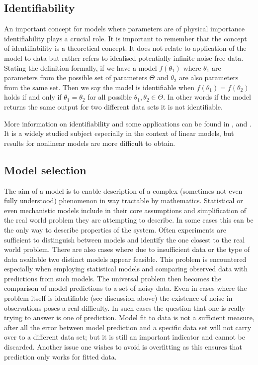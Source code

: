 \subsection{Identifiability}
\label{sec:identifiability-back}

An important concept for models where parameters are of physical importance identifiability plays a crucial role. It is important to remember that the concept of identifiability is a theoretical concept. It does not relate to application of the model to data but rather refers to idealised potentially infinite noise free data. Stating the definition formally, if we have a model $f(\theta_1)$ where $\theta_1$ are parameters from the possible set of parameters $\Theta$ and $\theta_2$ are also parameters from the same set. Then we say the model is identifiable when $f(\theta_1) = f(\theta_2)$ holds if and only if $\theta_1 = \theta_2$ for all possible $\theta_1, \theta_2 \in \Theta$. In other words if the model returns the same output for two different data sets it is not identifiable.

More information on identifiability and some applications can be found in \cite{Saccomani:2003kx},  \cite{Saccomani:2010by} and \cite{Jacquez:1985fz}. It is a widely studied subject especially in the context of linear models, but results for nonlinear models are more difficult to obtain. 

\subsection{Model selection}
\label{sec:model-selection-1}

The aim of a model is to enable description of a complex (sometimes not even fully understood) phenomenon in way tractable by mathematics. Statistical or even mechanistic models include in their core assumptions and simplification of the real world problem they are attempting to describe. In some cases this can be the only way to describe properties of the system. Often experiments are sufficient to distinguish between models and identify the one closest to the real world problem. There are also cases where due to insufficient data or the type of data available two distinct models appear feasible. This problem is encountered especially when employing statistical models and comparing observed data with predictions from such models. The universal problem then becomes the comparison of model predictions to a set of noisy data. Even in cases where the problem itself is identifiable (see discussion above) the existence of noise in observations poses a real difficulty. In such cases the question that one is really trying to answer is one of prediction. Model fit to data is not a sufficient measure, after all the error between model prediction and a specific data set will not carry over to a different data set; but it is still an important indicator and cannot be discarded. Another issue one wishes to avoid is overfitting as this ensures that prediction only works for fitted data.

